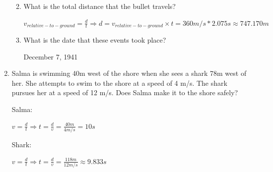 \documentclass[letterpaper, 12pt]{article}
\begin{document}
\begin{enumerate}
\begin{enumerate}
\begin{center}
\end{center}
\vspace {.15in}
\color{black}


	\item What is the total distance that the bullet travels?
	
		\color{red}
	\vspace {.15in}
	\begin{center} 	$ v_{relative-to-ground} = \frac{d}{t} \Longrightarrow d =  v_{relative-to-ground} \times t = 360 m/s * 2.075s  \approx  747.170 m $
		
	\end{center}
	\vspace {.15in}
	\color{black}
	
	
	
	

	\item What is the date that these events took place?
	
		\color{red}
	\vspace {.15in}
	\begin{center} 	December 7, 1941
		
	\end{center}
	\vspace {.15in}
	\color{black}
	
	
\end{enumerate}


\item Salma is swimming 40m west of the shore when she sees a shark 78m west of her.  She attempts to swim to the shore at a speed of 4 m/s.  The shark pursues her at a speed of 12 m/s.  Does Salma make it to the shore safely? 
\begin{multicols}{2} 
	
	

	
\color{red}
\begin{center} 	
	Salma:
	
	$v = \frac{d}{t} \Longrightarrow t = \frac{d}{v} = \frac {40m}{4 m/s} = 10 s$ 
	
		Shark:
	
	$v = \frac{d}{t} \Longrightarrow t = \frac{d}{v} = \frac {118m}{12 m/s} \approx 9.833 s$ 




	
\end{center}
\end{multicols}	


\color{black}



	
\end{enumerate}
 
\end{document}
